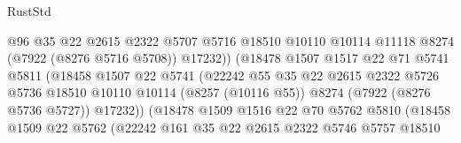 \begin{lexlean}{RustStd}
\begin{coremodule}
                                    @96
                                    @35
                                    @22
                                    @2615
                                    @2322
                                    @5707
                                    @5716
                                    @18510
                                    @10110
                                    @10114
                                    @11118
                                    @8274
                                    (@7922 (@8276 @5716 @5708))
                                    @17232))
                                (@18478
                                  @1507
                                  @1517
                                  @22
                                  @71
                                  @5741
                                  @5811
                                  (@18458
                                    @1507
                                    @22
                                    @5741
                                    (@22242
                                      @55
                                      @35
                                      @22
                                      @2615
                                      @2322
                                      @5726
                                      @5736
                                      @18510
                                      @10110
                                      @10114
                                      (@8257 (@10116 @55))
                                      @8274
                                      (@7922 (@8276 @5736 @5727))
                                      @17232))
                                  (@18478
                                    @1509
                                    @1516
                                    @22
                                    @70
                                    @5762
                                    @5810
                                    (@18458
                                      @1509
                                      @22
                                      @5762
                                      (@22242
                                        @161
                                        @35
                                        @22
                                        @2615
                                        @2322
                                        @5746
                                        @5757
                                        @18510

\end{coremodule}
\end{lexlean}
